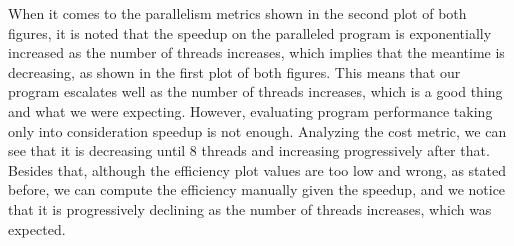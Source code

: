 When it comes to the parallelism metrics shown in the second plot of both figures, it is noted that the speedup on the paralleled program is exponentially increased as the number of threads increases, which implies that the meantime is decreasing, as shown in the first plot of both figures. This means that our program escalates well as the number of threads increases, which is a good thing and what we were expecting. However, evaluating program performance taking only into consideration speedup is not enough. Analyzing the cost metric, we can see that it is decreasing until 8 threads and increasing progressively after that. Besides that, although the efficiency plot values are too low and wrong, as stated before, we can compute the efficiency manually given the speedup, and we notice that it is progressively declining as the number of threads increases, which was expected.

